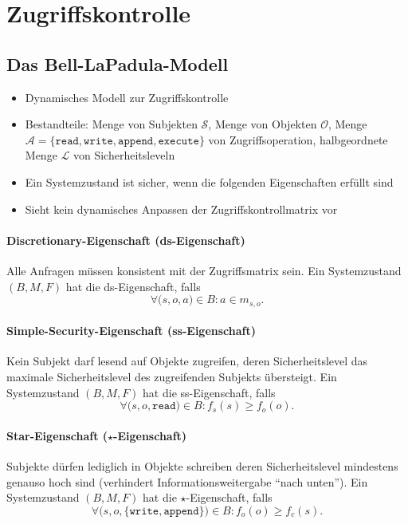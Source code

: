 \section{Zugriffskontrolle}

\subsection{Das Bell-LaPadula-Modell}
\begin{itemize}
	\item Dynamisches Modell zur Zugriffskontrolle
	\item Bestandteile: Menge von Subjekten \(\mathcal{S}\), Menge von Objekten \(\mathcal{O}\), Menge \(\mathcal{A} = \{\texttt{read},\texttt{write},\texttt{append},\texttt{execute}\}\) von Zugriffsoperation, halbgeordnete Menge \(\mathcal{L}\) von Sicherheitsleveln
	\item Ein Systemzustand ist sicher, wenn die folgenden Eigenschaften erfüllt sind
	\item Sieht kein dynamisches Anpassen der Zugriffskontrollmatrix vor
\end{itemize}

\paragraph{Discretionary-Eigenschaft (ds-Eigenschaft)}
Alle Anfragen müssen konsistent mit der Zugriffsmatrix sein. Ein Systemzustand \((B,M,F)\) hat die ds-Eigenschaft, falls
\[\forall\big(s,o,a\big) \in B : a \in m_{s,o}.\]

\paragraph{Simple-Security-Eigenschaft (ss-Eigenschaft)}
Kein Subjekt darf lesend auf Objekte zugreifen, deren Sicherheitslevel das maximale Sicherheitslevel des zugreifenden Subjekts übersteigt. Ein Systemzustand \((B,M,F)\) hat die ss-Eigenschaft, falls
\[\forall\big(s,o,\texttt{read}\big) \in B : f_s(s) \geq f_o(o).\]

\paragraph{Star-Eigenschaft (\(\star\)-Eigenschaft)}
Subjekte dürfen lediglich in Objekte schreiben deren Sicherheitslevel mindestens genauso hoch sind (verhindert Informationsweitergabe "`nach unten"'). Ein Systemzustand \((B,M,F)\) hat die \(\star\)-Eigenschaft, falls
\[\forall\big(s,o,\{\texttt{write},\texttt{append}\}\big) \in B : f_o(o) \geq f_c(s).\]

